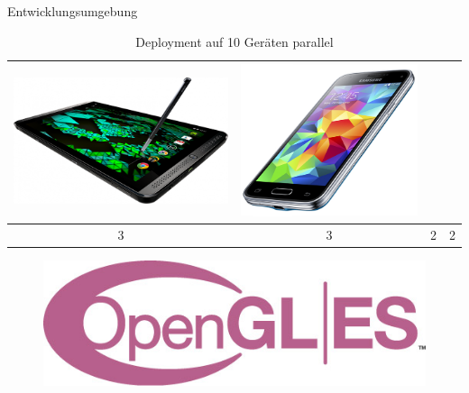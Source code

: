 \begin{frame}{Entwicklungsumgebung}
{\begin{table}[h]
\begin{tabular}{c|c|c|c}
		\includegraphics[width=\textwidth, height=0.1\textheight, keepaspectratio]{images/tablets} & 
		\includegraphics[width=\textwidth, height=0.1\textheight, keepaspectratio]{images/smartphones} \\ \hline
		3 & 3 & 2 & 2
	\end{tabular}
	\caption{Deployment auf 10 Geräten parallel}
	\end{table}
}
{
	\begin{figure}
		\centering
		\includegraphics[width=\textwidth, height=0.18\textheight, keepaspectratio]{images/opengl_es_logo}

\end{figure}}
\end{frame}
